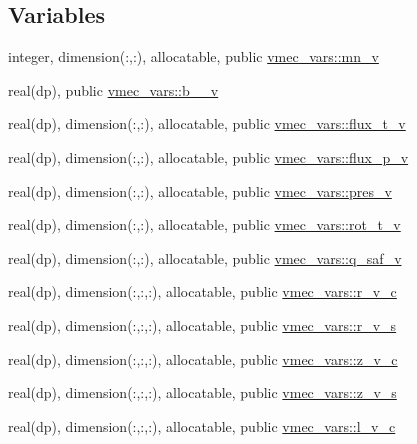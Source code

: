 \subsection*{Variables}
\begin{DoxyCompactItemize}
\item 
integer, dimension(\+:,\+:), allocatable, public \hyperlink{namespacevmec__vars_a4b9a64bc60d45f2b10e03f624ade3e82}{vmec\+\_\+vars\+::mn\+\_\+v}
\item 
real(dp), public \hyperlink{namespacevmec__vars_a71e1a738f0e423fe6c284f8ea636008e}{vmec\+\_\+vars\+::b\+\_\+\_\+v}
\item 
real(dp), dimension(\+:,\+:), allocatable, public \hyperlink{namespacevmec__vars_ac246a5937702b1ac4c7f9bd92d286766}{vmec\+\_\+vars\+::flux\+\_\+t\+\_\+v}
\item 
real(dp), dimension(\+:,\+:), allocatable, public \hyperlink{namespacevmec__vars_aeac5e1262f419b7ae674586f576dc928}{vmec\+\_\+vars\+::flux\+\_\+p\+\_\+v}
\item 
real(dp), dimension(\+:,\+:), allocatable, public \hyperlink{namespacevmec__vars_a958baf9fece8a4a001b6d8d767b48179}{vmec\+\_\+vars\+::pres\+\_\+v}
\item 
real(dp), dimension(\+:,\+:), allocatable, public \hyperlink{namespacevmec__vars_a676475bc7e07d96fc91c2773c8d2c84a}{vmec\+\_\+vars\+::rot\+\_\+t\+\_\+v}
\item 
real(dp), dimension(\+:,\+:), allocatable, public \hyperlink{namespacevmec__vars_a08f3862b0bb940623a416a056f03b092}{vmec\+\_\+vars\+::q\+\_\+saf\+\_\+v}
\item 
real(dp), dimension(\+:,\+:,\+:), allocatable, public \hyperlink{namespacevmec__vars_a8307a4a411dadf5b9be24f8aafac5f39}{vmec\+\_\+vars\+::r\+\_\+v\+\_\+c}
\item 
real(dp), dimension(\+:,\+:,\+:), allocatable, public \hyperlink{namespacevmec__vars_ac6cdafd632e37856533c42e8ab34a680}{vmec\+\_\+vars\+::r\+\_\+v\+\_\+s}
\item 
real(dp), dimension(\+:,\+:,\+:), allocatable, public \hyperlink{namespacevmec__vars_a66130a0eb0bc39ae0294f008f283efcd}{vmec\+\_\+vars\+::z\+\_\+v\+\_\+c}
\item 
real(dp), dimension(\+:,\+:,\+:), allocatable, public \hyperlink{namespacevmec__vars_ac6a5f1ccefd4c0337189c09166558bb1}{vmec\+\_\+vars\+::z\+\_\+v\+\_\+s}
\item 
real(dp), dimension(\+:,\+:,\+:), allocatable, public \hyperlink{namespacevmec__vars_acf90dcedfaae39a8a6778fbf75a90a40}{vmec\+\_\+vars\+::l\+\_\+v\+\_\+c}

\end{DoxyCompactItemize}
